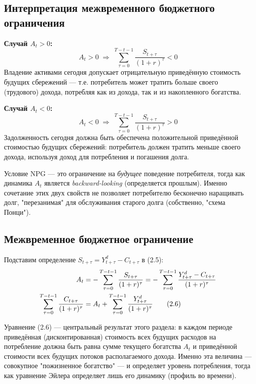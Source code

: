 \documentclass[10pt,a4paper]{article}
\begin{document}
\subsection{Интерпретация межвременного бюджетного ограничения}
 
\textbf{Случай $A_t > 0$:}
\[
A_t > 0 \;\Rightarrow\; \sum_{\tau=0}^{T-t-1} \frac{S_{t+\tau}}{(1+r)^\tau} < 0
\]
Владение активами сегодня допускает отрицательную приведённую стоимость будущих сбережений — т.е. потребитель может тратить больше своего (трудового) дохода, потребляя как из дохода, так и из накопленного богатства.
 
\textbf{Случай $A_t < 0$:}
\[
A_t < 0 \;\Rightarrow\; \sum_{\tau=0}^{T-t-1} \frac{S_{t+\tau}}{(1+r)^\tau} > 0
\]
Задолженность сегодня должна быть обеспечена положительной приведённой стоимостью будущих сбережений: потребитель должен тратить меньше своего дохода, используя доход для потребления и погашения долга.
 
\begin{intuition}
Условие NPG — это ограничение на \emph{будущее} поведение потребителя, тогда как динамика $A_t$ является \emph{backward-looking} (определяется прошлым). Именно сочетание этих двух свойств не позволяет потребителю бесконечно наращивать долг, "перезанимая" для обслуживания старого долга (собственно, "схема Понци").
\end{intuition}
 
\subsection{Межвременное бюджетное ограничение}
 
Подставим определение $S_{t+\tau} = Y_{t+\tau}^d - C_{t+\tau}$ в (2.5):
\begin{align}
A_t &= -\sum_{\tau=0}^{T-t-1}\frac{S_{t+\tau}}{(1+r)^\tau} = -\sum_{\tau=0}^{T-t-1}\frac{Y_{t+\tau}^d - C_{t+\tau}}{(1+r)^\tau}\notag\\
\sum_{\tau=0}^{T-t-1}\frac{C_{t+\tau}}{(1+r)^\tau} &= A_t + \sum_{\tau=0}^{T-t-1}\frac{Y_{t+\tau}^d}{(1+r)^\tau} \tag{2.6}
\end{align}
 
\begin{intuition}
Уравнение (2.6) — центральный результат этого раздела: в каждом периоде приведённая (дисконтированная) стоимость всех будущих расходов на потребление должна быть равна сумме текущего богатства $A_t$ и приведённой стоимости всех будущих потоков располагаемого дохода. Именно эта величина — совокупное "пожизненное богатство" — и определяет уровень потребления, тогда как уравнение Эйлера определяет лишь его динамику (профиль во времени).
\end{intuition}
 
\end{document}
